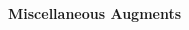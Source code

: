 \begin{multicols}{2}
\end{multicols}
\begin{multicols}{2}
\end{multicols}
\vspace{8mm}
\textbf{\large Miscellaneous Augments}\\
\par


